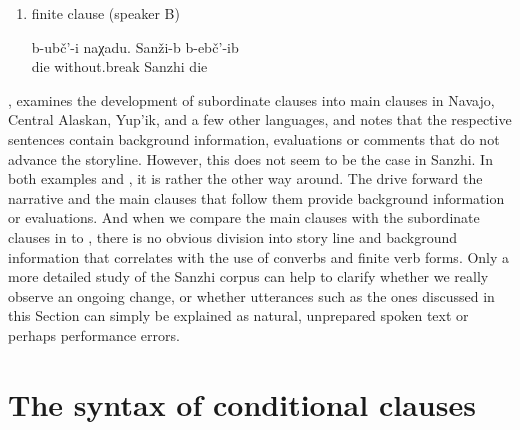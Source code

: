\begin{enumerate}
	\item	finite clause (speaker B)
	\begin{exe}
		\ex	\label{ex:‎They died without stopping, in Sanzhi (people) died}
		\gll	b-ubč'-i	naχadu.	Sanži-b	b-ebč'-ib\\
			die	without.break	Sanzhi	die\\
		\glt	{}
	\end{exe}
\end{enumerate}

\citet{Mithun2008}, examines the development of subordinate clauses into main clauses in Navajo, Central Alaskan, Yup'ik, and a few other languages, and notes that the respective sentences contain background information, evaluations or comments that do not advance the storyline. However, this does not seem to be the case in Sanzhi. In both examples  and , it is rather the other way around. The  drive forward the narrative and the main clauses that follow them provide background information or evaluations. And when we compare the main clauses with the subordinate clauses in  to , there is no obvious division into story line and background information that correlates with the use of converbs and finite verb forms. Only a more detailed study of the Sanzhi corpus can help to clarify whether we really observe an ongoing change, or whether utterances such as the ones discussed in this Section can simply be explained as natural, unprepared spoken text or perhaps performance errors.



\section{The syntax of conditional clauses}
\label{sec:The syntax of conditional clauses}

